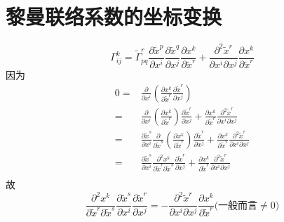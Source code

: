 \section{黎曼联络系数的坐标变换}
    \begin{equation*}
        \Gamma_{ij}^{k}=\tilde{\Gamma}_{pq}^{r}\frac{\partial\tilde{x}^p}{\partial x^i}\frac{\partial\tilde{x}^q}{\partial x^j}\frac{\partial x^k}{\partial\tilde{x}^r}+\frac{\partial^2\tilde{x}^r}{\partial x^i \partial x^j}\frac{\partial x^k}{\partial\tilde{x}^r}
    \end{equation*}
    因为
    \begin{align*}
        0 =& \frac{\partial}{\partial x^i}\left(\frac{\partial x^k}{\partial\tilde{x}^r}\frac{\partial\tilde{x}^r}{\partial x^j}\right) \\
        =& \frac{\partial}{\partial x^i}\left(\frac{\partial x^k}{\partial\tilde{x}^r}\right)\frac{\partial\tilde{x}^r}{\partial x^j} + \frac{\partial x^k}{\partial\tilde{x}^r}\frac{\partial^2\tilde{x}^r}{\partial x^i\partial x^j} \\
        =& \frac{\partial\tilde{x}^s}{\partial x^i}\frac{\partial}{\partial\tilde{x}^s}\left(\frac{\partial x^k}{\partial\tilde{x}^r}\right)\frac{\partial\tilde{x}^r}{\partial x^j} + \frac{\partial x^k}{\partial\tilde{x}^r}\frac{\partial^2\tilde{x}^r}{\partial x^i\partial x^j} \\
        =& \frac{\partial\tilde{x}^s}{\partial x^i}\frac{\partial^2 x^k}{\partial\tilde{x}^r\partial\tilde{x}^s}\frac{\partial\tilde{x}^r}{\partial x^j} + \frac{\partial x^k}{\partial\tilde{x}^r}\frac{\partial^2\tilde{x}^r}{\partial x^i\partial x^j} \\
    \end{align*}
    故
    \begin{equation*}
        \frac{\partial^2 x^k}{\partial\tilde{x}^r\partial\tilde{x}^s}\frac{\partial\tilde{x}^s}{\partial x^i}\frac{\partial\tilde{x}^r}{\partial x^j} = -\frac{\partial^2\tilde{x}^r}{\partial x^i\partial x^j}\frac{\partial x^k}{\partial\tilde{x}^r}\Big(\text{一般而言}\neq0\Big)
    \end{equation*}

